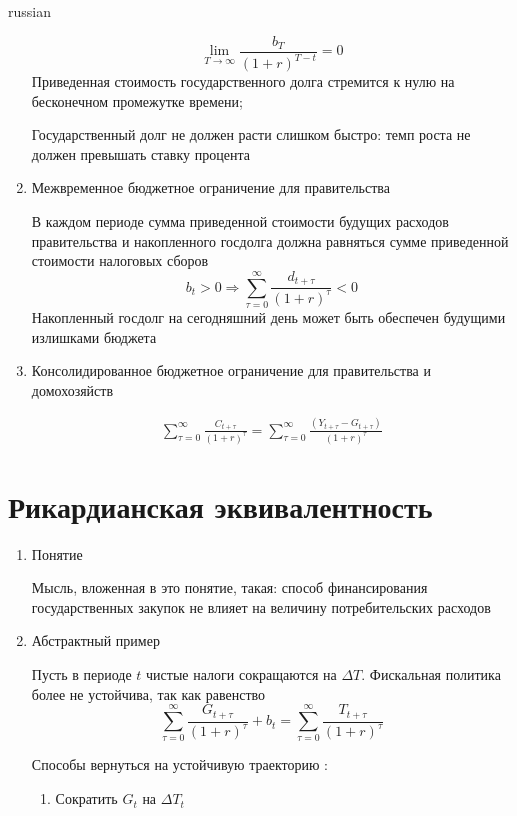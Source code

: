 \documentclass{article}
\begin{document}
\begin{otherlanguage*}{russian}
\begin{enumerate}
\begin{equation}
\lim_{T \rightarrow \infty} \frac{b_T}{(1 + r)^{T - t}} = 0 
\end{equation}
Приведенная стоимость государственного долга стремится к нулю на бесконечном промежутке времени;

Государственный долг не должен расти слишком быстро: темп роста не должен превышать ставку процента 

\item Межвременное бюджетное ограничение для правительства

В каждом периоде сумма приведенной стоимости будущих расходов правительства и накопленного госдолга должна равняться сумме приведенной стоимости налоговых сборов
\begin{equation}
b_t > 0 \Rightarrow \sum_{\tau = 0}^{\infty} \frac{d_{t+\tau}}{(1 + r)^{\tau}} < 0 
\end{equation}
Накопленный госдолг на сегодняшний день может быть обеспечен будущими излишками бюджета
\item Консолидированное бюджетное ограничение для правительства и домохозяйств 

\begin{align}
\sum_{\tau = 0}^{\infty} \frac{C_{t + \tau}}{(1 + r)^{\tau}} = \sum_{\tau = 0}^{\infty} \frac{(Y_{t + \tau} - G_{t + \tau})}{(1 + r)^{\tau}} 
\end{align}
\end{enumerate}
\section{\foreignlanguage{russian}{Рикардианская эквивалентность}}
\begin{enumerate}
\item Понятие

Мысль, вложенная в это понятие, такая: способ финансирования государственных закупок не влияет на величину потребительских расходов

\item Абстрактный пример

Пусть в периоде $ t $ чистые налоги сокращаются на $ \Delta T$. Фискальная политика более не устойчива, так как равенство 
\begin{equation}
\sum_{\tau = 0}^{\infty} \frac{G_{t + \tau}}{(1 + r)^{\tau}} + b_t = \sum_{\tau = 0}^{\infty} \frac{T_{t + \tau}}{(1 + r)^{\tau}}
\end{equation}

Способы вернуться на устойчивую траекторию :
\begin{enumerate}
\item Сократить $G_t$ на $\Delta T_t$ 


\end{enumerate}
\end{enumerate}
\end{otherlanguage*}
\end{document}
